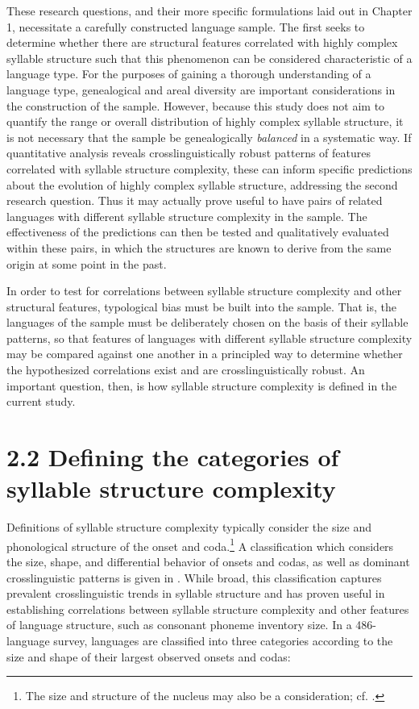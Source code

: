   These research questions, and their more specific formulations laid out in Chapter 1, necessitate a carefully constructed language sample. The first seeks to determine whether there are structural features correlated with highly complex syllable structure such that this phenomenon can be considered characteristic of a language type. For the purposes of gaining a thorough understanding of a language type, genealogical and areal diversity are important considerations in the construction of the sample. However, because this study does not aim to quantify the range or overall distribution of highly complex syllable structure, it is not necessary that the sample be genealogically \textit{balanced} in a systematic way. If quantitative analysis reveals crosslinguistically robust patterns of features correlated with syllable structure complexity, these can inform specific predictions about the evolution of highly complex syllable structure, addressing the second research question. Thus it may actually prove useful to have pairs of related languages with different syllable structure complexity in the sample. The effectiveness of the predictions can then be tested and qualitatively evaluated within these pairs, in which the structures are known to derive from the same origin at some point in the past.



  In order to test for correlations between syllable structure complexity and other structural features, typological bias \citep[12]{Comrie1989} must be built into the sample. That is, the languages of the sample must be deliberately chosen on the basis of their syllable patterns, so that features of languages with different syllable structure complexity may be compared against one another in a principled way to determine whether the hypothesized correlations exist and are crosslinguistically robust. An important question, then, is how syllable structure complexity is defined in the current study.


\section{2.2 Defining the categories of syllable structure complexity}

  Definitions of syllable structure complexity typically consider the size and phonological structure of the onset and coda.\footnote{ \textrm{The size and structure of the nucleus may also be a consideration; cf. \citet{MaddiesonEtAl2013}.}} A classification which considers the size, shape, and differential behavior of onsets and codas, as well as dominant crosslinguistic patterns is given in \citet{Maddieson2013a}. While broad, this classification captures prevalent crosslinguistic trends in syllable structure and has proven useful in establishing correlations between syllable structure complexity and other features of language structure, such as consonant phoneme inventory size. In a 486-language survey, languages are classified into three categories according to the size and shape of their largest observed onsets and codas: 



